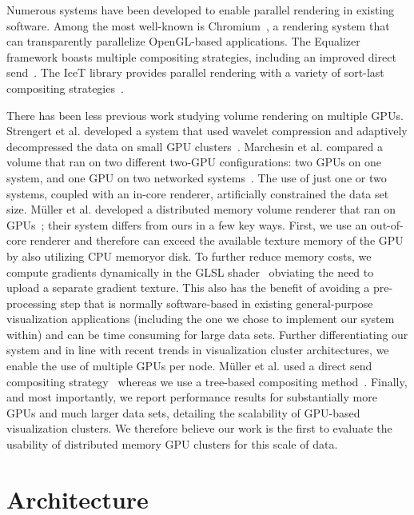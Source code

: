 Numerous systems have been developed to enable parallel rendering in
existing software.  Among the most well-known is
Chromium~\cite{Humphreys:2002:Chromium}, a rendering system that can
transparently parallelize OpenGL-based applications.  The Equalizer
framework boasts multiple compositing strategies, including an improved
direct
send~\cite{Eilemann:2007:DSend}.  The IceT library provides parallel
rendering with a variety of sort-last compositing
strategies~\cite{Moreland:2001:IceT}.

There has been less previous work studying volume rendering on
multiple GPUs.  Strengert et al. developed a system that used wavelet
compression and adaptively decompressed the data on small GPU
clusters~\cite{Strengert:2004:ClusterVolRen}. Marchesin et al. compared
a volume that ran on two different two-GPU configurations: two GPUs on
one system, and one GPU on two networked
systems~\cite{Marchesin:2008:MultiGPU}. The use of just one or two
systems, coupled with an in-core renderer, artificially constrained the
data set size.  M\"uller et al. developed a distributed memory volume
renderer that ran on
GPUs~\cite{Mueller:2006:ParallelVRen}; their system differs from
ours in a few key ways.  First, we use an out-of-core renderer and
therefore can exceed the available texture memory of the GPU by also
utilizing CPU memoryor disk.  To further reduce memory costs, we
compute gradients
dynamically in the GLSL shader~\cite{Krueger:2003:ATGV} obviating the
need to upload a separate gradient texture.  This also has the benefit
of avoiding a pre-processing step that is normally software-based in
existing general-purpose visualization applications (including the one
we chose to implement our system within) and can be time consuming for
large data sets.  Further differentiating our system and in line with
recent trends in visualization cluster architectures, we enable the use
of multiple GPUs per node.  M\"uller et al. used a direct send
compositing strategy~\cite{Hsu:1993:SRC, Ma:1993:DSend} whereas we use
a tree-based compositing method~\cite{Moreland:2001:IceT}.  Finally,
and most importantly, we report performance results for substantially
more GPUs and much larger data sets, detailing the scalability of
GPU-based visualization clusters.  We therefore believe our work is the
first to evaluate the usability of distributed memory GPU clusters for
this scale of data.

\section{Architecture}
\label{sec:arch}

